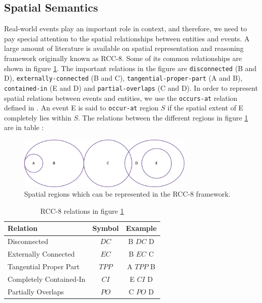 \subsection{Spatial Semantics}
Real-world events play an important role in context, and therefore, we need to pay special attention to the spatial relationships between entities and events. A large amount of literature is available on spatial representation and reasoning framework originally known as RCC-8. Some of its common relationships are shown in figure \ref{fig:rcc8}. The important relations in the figure are \texttt{disconnected} (B and D), \texttt{externally-connected} (B and C), \texttt{tangential-proper-part} (A and B), \texttt{contained-in} (E and D) and \texttt{partial-overlaps} (C and D). In order to represent spatial relations between events and entities, we use the \texttt{occurs-at} relation defined in \cite{gupta2011managing}. An event E is said to \texttt{occur-at} region $S$ if the spatial extent of E completely lies within $S$. The relations between the different regions in figure \ref{fig:rcc8} are in table :

\begin{figure}[h]
\centering
\includegraphics[width=0.75\textwidth]{media/chapter2/rcc8-combined.png}
\caption{Spatial regions which can be represented in the RCC-8 framework.}
\label{fig:rcc8}
\end{figure}

\begin{table}[h]
 \centering
 \begin{tabular}{ | l | c | c |}
  \hline
  \textbf{Relation} & \textbf{Symbol} & \textbf{Example} \\ \hline
    Disconnected & $DC$ & B $DC$ D \\ \hline
    Externally Connected & $EC$ & B $EC$ C \\ \hline
    Tangential Proper Part & $TPP$ & A $TPP$ B \\ \hline
    Completely Contained-In & $CI$ & E $CI$ D \\ \hline
    Partially Overlaps & $PO$ & C $PO$ D \\ \hline
  \end{tabular}
 \caption{RCC-8 relations in figure \ref{fig:rcc8}}
\end{table}

